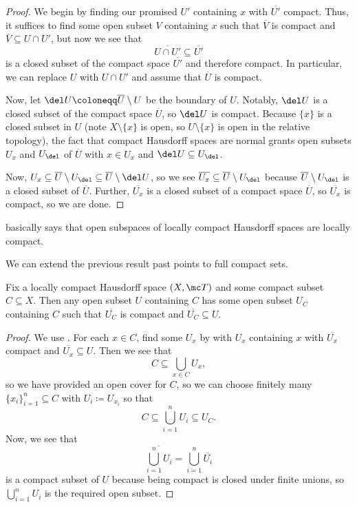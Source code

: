 \documentclass[../notes.tex]{subfiles}
\begin{document}
\begin{proof}
	We begin by finding our promised $U'$ containing $x$ with $\overline{U'}$ compact. Thus, it suffices to find some open subset $V$ containing $x$ such that $\overline V$ is compact and $\overline V\subseteq U\cap U'$, but now we see that
	\[\overline{U\cap U'}\subseteq\overline{U'}\]
	is a closed subset of the compact space $\overline{U'}$ and therefore compact. In particular, we can replace $U$ with $U\cap U'$ and assume that $\overline U$ is compact.

	Now, let $\del U\coloneqq\overline U\setminus U$ be the boundary of $U$. Notably, $\del U$ is a closed subset of the compact space $\overline U$, so $\del U$ is compact. Because $\{x\}$ is a closed subset in $U$ (note $X\setminus\{x\}$ is open, so $U\setminus\{x\}$ is open in the relative topology), the fact that compact Hausdorff spaces are normal grants open subsets $U_x$ and $U_{\del}$ of $\overline U$ with $x\in U_x$ and $\del U\subseteq U_\del$.

	Now, $U_x\subseteq\overline U\setminus U_\del\subseteq\overline U\setminus{\del U}$, so we see $\overline{U_x}\subseteq\overline U\setminus U_\del$ because $\overline U\setminus U_\del$ is a closed subset of $\overline U$. Further, $\overline{U_x}$ is a closed subset of a compact space $\overline U$, so $\overline{U_x}$ is compact, so we are done.
\end{proof}
\begin{remark}
	 basically says that open subspaces of locally compact Hausdorff spaces are locally compact.
\end{remark}
We can extend the previous result past points to full compact sets.
\begin{proposition} \label{prop:best-loc-compact}
	Fix a locally compact Hausdorff space $(X,\mc T)$ and some compact subset $C\subseteq X$. Then any open subset $U$ containing $C$ has some open subset $U_C$ containing $C$ such that $\overline{U_C}$ is compact and $\overline{U_C}\subseteq U$.
\end{proposition}
\begin{proof}
	We use . For each $x\in C$, find some $U_x$ by  with $U_x$ containing $x$ with $\overline{U_x}$ compact and $\overline{U_x}\subseteq U$. Then we see that
	\[C\subseteq\bigcup_{x\in C}U_x,\]
	so we have provided an open cover for $C$, so we can choose finitely many $\{x_i\}_{i=1}^n\subseteq C$ with $U_i\coloneqq U_{x_i}$ so that
	\[C\subseteq\bigcup_{i=1}^nU_i\subseteq U_C.\]
	Now, we see that
	\[\overline{\bigcup_{i=1}^nU_i}=\bigcup_{i=1}^n\overline{U_i}\]
	is a compact subset of $U$ because being compact is closed under finite unions, so $\bigcup_{i=1}^nU_i$ is the required open subset.
\end{proof}
\end{document}
